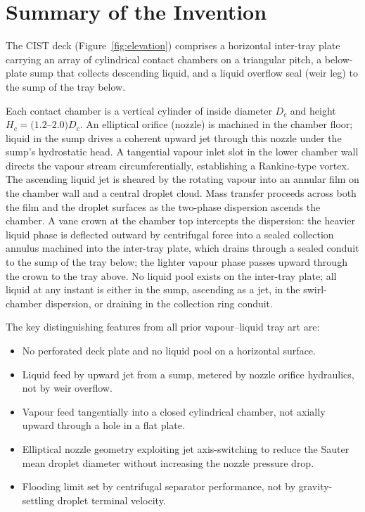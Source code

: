 \documentclass[11pt,letterpaper]{article}
\newcommand{\Hc}{H_c}
\newcommand{\Dc}{D_c}
\begin{document}
\section{Summary of the Invention}

The CIST deck (Figure~\ref{fig:elevation}) comprises a horizontal inter-tray
plate carrying an array of cylindrical contact chambers on a triangular
pitch, a below-plate sump that collects descending liquid, and a liquid
overflow seal (weir leg) to the sump of the tray below.

Each contact chamber is a vertical cylinder of inside diameter $\Dc$ and
height $\Hc = (1.2$--$2.0)\Dc$.  An elliptical orifice (nozzle) is machined
in the chamber floor; liquid in the sump drives a coherent upward jet through
this nozzle under the sump's hydrostatic head.  A tangential vapour inlet
slot in the lower chamber wall directs the vapour stream circumferentially,
establishing a Rankine-type vortex.  The ascending liquid jet is sheared by
the rotating vapour into an annular film on the chamber wall and a central
droplet cloud.  Mass transfer proceeds across both the film and the droplet
surfaces as the two-phase dispersion ascends the chamber.  A vane crown at
the chamber top intercepts the dispersion: the heavier liquid phase is
deflected outward by centrifugal force into a sealed collection annulus
machined into the inter-tray plate, which drains through a sealed conduit to
the sump of the tray below; the lighter vapour phase passes upward through
the crown to the tray above.  No liquid pool exists on the inter-tray plate;
all liquid at any instant is either in the sump, ascending as a jet, in
the swirl-chamber dispersion, or draining in the collection ring conduit.

The key distinguishing features from all prior vapour--liquid tray art are:
\begin{itemize}[nosep]
  \item No perforated deck plate and no liquid pool on a horizontal surface.
  \item Liquid feed by upward jet from a sump, metered by nozzle orifice
    hydraulics, not by weir overflow.
  \item Vapour feed tangentially into a closed cylindrical chamber, not
    axially upward through a hole in a flat plate.
  \item Elliptical nozzle geometry exploiting jet axis-switching to reduce
    the Sauter mean droplet diameter without increasing the nozzle pressure
    drop.
  \item Flooding limit set by centrifugal separator performance, not by
    gravity-settling droplet terminal velocity.
\end{itemize}
\end{document}
